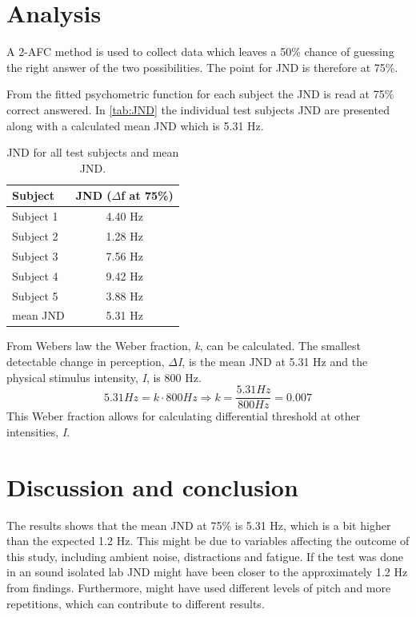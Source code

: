 \section*{Analysis}
%
A 2-AFC method is used to collect data which leaves a 50\% chance of guessing the right answer of the two possibilities. The point for JND is therefore at 75\%.

From the fitted psychometric function for each subject the JND is read at 75\% correct answered. In \autoref{tab:JND} the individual test subjects JND are presented along with a calculated mean JND which is 5.31 Hz. 
%
\begin{table}[H]
\centering
\begin{tabular}{l|c}
Subject     & JND ($\Delta$f at 75\%) \\\hline
Subject 1   & 4.40 Hz                 \\\hline
Subject 2   & 1.28 Hz                 \\\hline
Subject 3   & 7.56 Hz                 \\\hline
Subject 4   & 9.42 Hz                 \\\hline
Subject 5   & 3.88 Hz                 \\\hline
mean JND & 5.31 Hz       
\end{tabular}
\caption{JND for all test subjects and mean JND.}
\label{tab:JND}         
\end{table}
\noindent
%
From Webers law the Weber fraction, \textit{k}, can be calculated. The smallest detectable change in perception, \textit{$\Delta$I}, is the mean JND at 5.31 Hz and the physical stimulus intensity, \textit{I}, is 800 Hz.
% 
\begin{equation}
5.31 Hz = k \cdot 800 Hz \Rightarrow k = \frac{5.31 Hz}{800 Hz} = 0.007
\end{equation}
%
This Weber fraction allows for calculating differential threshold at other intensities, \textit{I}. 
%

\section*{Discussion and conclusion}
%
The results shows that the mean JND at 75\% is 5.31 Hz, which is a bit higher than the expected 1.2 Hz. This might be due to variables affecting the outcome of this study, including ambient noise, distractions and fatigue. If the test was done in an sound isolated lab JND might have been closer to the approximately 1.2 Hz from \citep{Wier1977} findings. Furthermore, \citep{Wier1977} might have used different levels of pitch and more repetitions, which can contribute to different results. 

